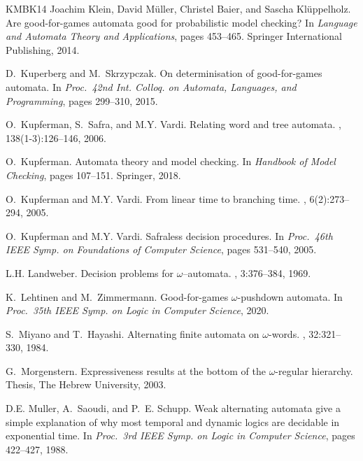 \documentclass[10pt,a4paper]{amsart}
\theoremstyle{definition}
\numberwithin{equation}{section}
\begin{document}
\begin{thebibliography}{KMBK14}
Joachim Klein, David M{\"u}ller, Christel Baier, and Sascha Kl{\"u}ppelholz.
\newblock Are good-for-games automata good for probabilistic model checking?
\newblock In {\em Language and Automata Theory and Applications}, pages
  453--465. Springer International Publishing, 2014.

D.~Kuperberg and M.~Skrzypczak.
\newblock On determinisation of good-for-games automata.
\newblock In {\em Proc.\ 42nd Int. Colloq. on Automata, Languages, and
  Programming}, pages 299--310, 2015.

O.~Kupferman, S.~Safra, and M.Y. Vardi.
\newblock Relating word and tree automata.
, 138(1-3):126--146, 2006.

O.~Kupferman.
\newblock Automata theory and model checking.
\newblock In {\em Handbook of Model Checking}, pages 107--151. Springer, 2018.

O.~Kupferman and M.Y. Vardi.
\newblock From linear time to branching time.
, 6(2):273--294, 2005.

O.~Kupferman and M.Y. Vardi.
\newblock Safraless decision procedures.
\newblock In {\em Proc.\ 46th IEEE Symp. on Foundations of Computer Science},
  pages 531--540, 2005.

L.H. Landweber.
\newblock Decision problems for $\omega$--automata.
, 3:376--384, 1969.

K.~Lehtinen and M.~Zimmermann.
\newblock Good-for-games {$\omega$}-pushdown automata.
\newblock In {\em Proc.\ 35th IEEE Symp. on Logic in Computer Science}, 2020.

S.~Miyano and T.~Hayashi.
\newblock Alternating finite automata on $\omega$-words.
, 32:321--330, 1984.

G.~Morgenstern.
\newblock Expressiveness results at the bottom of the $\omega$-regular
  hierarchy.
 Thesis, The Hebrew University, 2003.

D.E. Muller, A.~Saoudi, and P.~E. Schupp.
\newblock Weak alternating automata give a simple explanation of why most
  temporal and dynamic logics are decidable in exponential time.
\newblock In {\em Proc.\ 3rd IEEE Symp. on Logic in Computer Science}, pages
  422--427, 1988.


\end{thebibliography}
\end{document}
